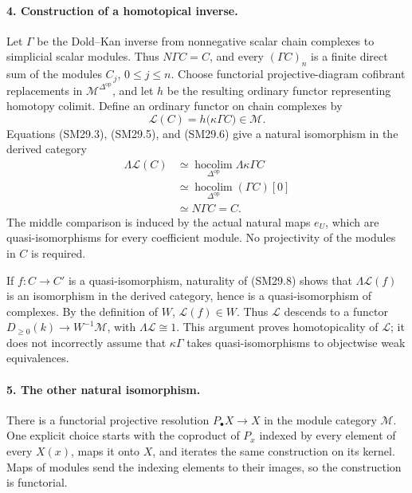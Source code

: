 \documentclass[11pt,a4paper]{article}
\theoremstyle{definition}\newtheorem{definition}[theorem]{Definition}
\theoremstyle{remark}\newtheorem{remark}[theorem]{Remark}
\begin{document}
\paragraph{4. Construction of a homotopical inverse.}
Let \(\Gamma\) be the Dold--Kan inverse from nonnegative
scalar chain complexes to simplicial scalar modules.
Thus \(N\Gamma C=C\), and every \((\Gamma C)_n\) is a
finite direct sum of the modules \(C_j\), \(0\le j\le n\).
Choose functorial projective-diagram cofibrant replacements
in \(\mathcal M^{\Delta^{\mathrm{op}}}\), and let \(h\) be
the resulting ordinary functor representing homotopy colimit.
Define an ordinary functor on chain complexes by
\[
 \mathcal L(C)=h\bigl(\kappa\Gamma C\bigr)\in\mathcal M.
 \tag{SM29.7}
\]
Equations (SM29.3), (SM29.5), and (SM29.6) give a natural
isomorphism in the derived category
\[
 \begin{split}
 \Lambda\mathcal L(C)
 &\simeq\operatorname*{hocolim}_{\Delta^{\mathrm{op}}}
               \Lambda\kappa\Gamma C\\
 &\simeq\operatorname*{hocolim}_{\Delta^{\mathrm{op}}}
               (\Gamma C)[0]\\
 &\simeq N\Gamma C=C.
 \end{split}
 \tag{SM29.8}
\]
The middle comparison is induced by the actual natural maps
\(e_U\), which are quasi-isomorphisms for every coefficient
module.  No projectivity of the modules in \(C\) is required.

If \(f:C\to C'\) is a quasi-isomorphism, naturality of
(SM29.8) shows that \(\Lambda\mathcal L(f)\) is an
isomorphism in the derived category, hence is a
quasi-isomorphism of complexes.
By the definition of \(W\), \(\mathcal L(f)\in W\).
Thus \(\mathcal L\) descends to a functor
\(D_{\ge0}(k)\to W^{-1}\mathcal M\), with
\(\Lambda\mathcal L\cong1\).
This argument proves homotopicality of \(\mathcal L\);
it does not incorrectly assume that \(\kappa\Gamma\)
takes quasi-isomorphisms to objectwise weak equivalences.

\paragraph{5. The other natural isomorphism.}
There is a functorial projective resolution \(P_\bullet X\to X\)
in the module category \(\mathcal M\).
One explicit choice starts with the coproduct of \(P_x\)
indexed by every element of every \(X(x)\), maps it onto
\(X\), and iterates the same construction on its kernel.
Maps of modules send the indexing elements to their images,
so the construction is functorial.
\end{document}
